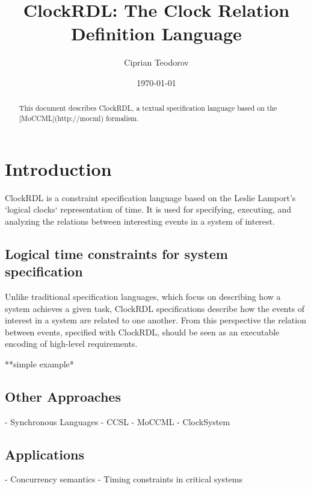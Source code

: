 \documentclass[11pt, oneside]{article}   	%
\title{ClockRDL: The Clock Relation Definition Language}
\author{Ciprian Teodorov}
\date{\today}							%
\begin{document}
\maketitle
\begin{abstract}

This document describes ClockRDL, a textual specification language based on the [MoCCML](http://mocml) formalism.

\end{abstract}

\section{Introduction}
ClockRDL is a constraint specification language based on the Leslie Lamport's `logical clocks` representation of time. It is used for specifying, executing, and analyzing the relations between interesting events in a system of interest.

\subsection{Logical time constraints for system specification}
Unlike traditional specification languages, which focus on describing how a system achieves a given task, ClockRDL specifications describe how the events of interest in a system are related to one another. From this perspective the relation between events, specified with ClockRDL, should be seen as an executable encoding of high-level requirements.

**simple example*

\subsection{Other Approaches}

- Synchronous Languages
- CCSL
- MoCCML
- ClockSystem

\subsection{Applications}
- Concurrency semantics
- Timing constraints in critical systems
\end{document}
